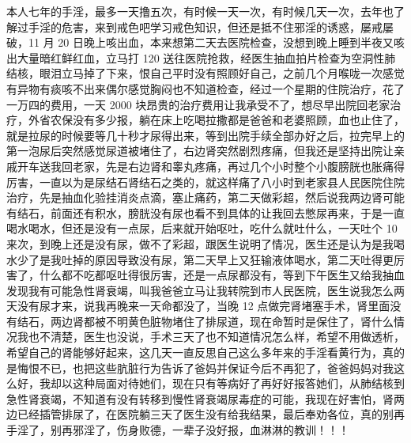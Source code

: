 \begin{case}
    本人七年的手淫，最多一天撸五次，有时候一天一次，有时候几天一次，去年也了解过手淫的危害，来到戒色吧学习戒色知识，但还是抵不住邪淫的诱惑，屡戒屡破，11 月 20 日晚上咳出血，本来想第二天去医院检查，没想到晚上睡到半夜又咳出大量暗红鲜红血，立马打 120 送往医院抢救，经医生抽血拍片检查为空洞性肺结核，眼泪立马掉了下来，恨自己平时没有照顾好自己，之前几个月喉咙一次感觉有异物有痰咳不出来偶尔感觉胸闷也不知道检查，经过一个星期的住院治疗，花了一万四的费用，一天 2000 块昂贵的治疗费用让我承受不了，想尽早出院回老家治疗，外省农保没有多少报，躺在床上吃喝拉撒都是爸爸和老婆照顾，血也止住了，就是拉尿的时候要等几十秒才尿得出来，等到出院手续全部办好之后，拉完早上的第一泡尿后突然感觉尿道被堵住了，右边肾突然剧烈疼痛，但我还是坚持出院让亲戚开车送我回老家，先是右边肾和睾丸疼痛，再过几个小时整个小腹膀胱也胀痛得厉害，一直以为是尿结石肾结石之类的，就这样痛了八小时到老家县人民医院住院治疗，先是抽血化验挂消炎点滴，塞止痛药，第二天做彩超，然后说我两边肾可能有结石，前面还有积水，膀胱没有尿也看不到具体的让我回去憋尿再来，于是一直喝水喝水，但还是没有一点尿，后来就开始呕吐，吃什么就吐什么，一天吐个 10 来次，到晚上还是没有尿，做不了彩超，跟医生说明了情况，医生还是认为是我喝水少了是我吐掉的原因导致没有尿，第二天早上又狂输液体喝水，第二天吐得更厉害了，什么都不吃都呕吐得很厉害，还是一点尿都没有，等到下午医生又给我抽血发现我有可能急性肾衰竭，叫我爸爸立马让我转院到市人民医院，医生说我怎么两天没有尿才来，说我再晚来一天命都没了，当晚 12 点做完肾堵塞手术，肾里面没有结石，两边肾都被不明黄色脏物堵住了排尿道，现在命暂时是保住了，肾什么情况我也不清楚，医生也没说，手术三天了也不知道情况怎么样，希望不用做透析，希望自己的肾能够好起来，这几天一直反思自己这么多年来的手淫看黄行为，真的是悔恨不已，也把这些肮脏行为告诉了爸妈并保证今后不再犯了，爸爸妈妈对我这么好，我却以这种局面对待她们，现在只有等病好了再好好报答她们，从肺结核到急性肾衰竭，不知道有没有转移到慢性肾衰竭尿毒症的可能，我现在好害怕，肾两边已经插管排尿了，在医院躺三天了医生没有给我结果，最后奉劝各位，真的别再手淫了，别再邪淫了，伤身败德，一辈子没好报，血淋淋的教训！！！

\end{case}
